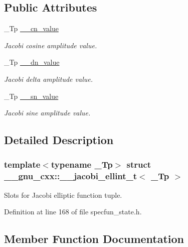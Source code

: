 \subsection*{Public Attributes}
\begin{DoxyCompactItemize}
\item 
\+\_\+\+Tp \hyperlink{struct____gnu__cxx_1_1____jacobi__ellint__t_a2ea9630244e97bfe0e182dbb5682ee30}{\+\_\+\+\_\+cn\+\_\+value}
\begin{DoxyCompactList}\small\item\em Jacobi cosine amplitude value. \end{DoxyCompactList}\item 
\+\_\+\+Tp \hyperlink{struct____gnu__cxx_1_1____jacobi__ellint__t_a08d15b208e574536f8c6113fc7d0c9a9}{\+\_\+\+\_\+dn\+\_\+value}
\begin{DoxyCompactList}\small\item\em Jacobi delta amplitude value. \end{DoxyCompactList}\item 
\+\_\+\+Tp \hyperlink{struct____gnu__cxx_1_1____jacobi__ellint__t_a011eb5bb9a1a6d845a26f17b485cf3d4}{\+\_\+\+\_\+sn\+\_\+value}
\begin{DoxyCompactList}\small\item\em Jacobi sine amplitude value. \end{DoxyCompactList}\end{DoxyCompactItemize}


\subsection{Detailed Description}
\subsubsection*{template$<$typename \+\_\+\+Tp$>$\newline
struct \+\_\+\+\_\+gnu\+\_\+cxx\+::\+\_\+\+\_\+jacobi\+\_\+ellint\+\_\+t$<$ \+\_\+\+Tp $>$}

Slots for Jacobi elliptic function tuple. 

Definition at line 168 of file specfun\+\_\+state.\+h.



\subsection{Member Function Documentation}
\mbox{\label{struct____gnu__cxx_1_1____jacobi__ellint__t_ab9ac21f42a1fc90e86ba76394e413ea7}} 

